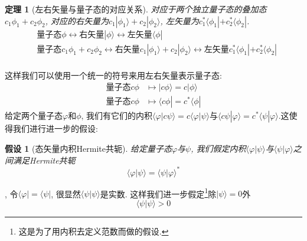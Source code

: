 \documentclass[a4paper,11pt]{book}
\newtheorem{theorem}{\hspace{2em}定理}[section]
\newtheorem{hypothesis}{假设}[section]
\begin{document}
\begin{theorem}[左右矢量与量子态的对应关系]
  对应于两个独立量子态的叠加态$c_1\phi_1+c_2\phi_2$, 对应的右矢量为$c_1|\phi_1\rangle+c_2|\phi_2\rangle$, 左矢量为$c_1^*\langle\phi_1|+c_2^*\langle\phi_2|$.
\begin{equation*}
  \begin{split}
     &\text{量子态}\phi\longleftrightarrow\text{右矢量}|\phi\rangle\longleftrightarrow\text{左矢量}\langle\phi|\\
     &\text{量子态}c_1\phi_1+c_2\phi_2\longleftrightarrow\text{右矢量}c_1|\phi_1\rangle+c_2|\phi_2\rangle\longleftrightarrow\text{左矢量}c_1^*\langle\phi_1|+c_2^*\langle\phi_2|\\
  \end{split}
\end{equation*}
\end{theorem}
这样我们可以使用一个统一的符号来用左右矢量表示量子态:
\begin{equation*}
  \begin{split}
     \text{量子态}c\phi & \longmapsto|c\phi\rangle=c|\phi\rangle \\
     \text{量子态}c\phi & \longmapsto\langle c\phi|=c^*\langle\phi|
  \end{split}
\end{equation*}
给定两个量子态$\varphi$和$\phi$, 我们有它们的内积$\langle\varphi|c\psi\rangle=c\langle\varphi|\psi\rangle$与$\langle c\psi|\varphi\rangle=c^*\langle\psi|\varphi\rangle$.这使得我们进行进一步的假设:
\begin{hypothesis}[态矢量内积Hermite共轭]
给定量子态$\varphi$与$\psi$, 我们假定内积$\langle\varphi|\psi\rangle$与$\langle\psi|\varphi\rangle$之间满足Hermite共轭
\begin{equation*}
  \langle\varphi|\psi\rangle=\langle\psi|\varphi\rangle^*
\end{equation*}
\end{hypothesis}
, 令$\langle\varphi|=\langle\psi|$, 很显然$\langle\psi|\psi\rangle$是实数. 这样我们进一步假定\footnote{这是为了用内积去定义范数而做的假设.}除$|\psi\rangle=0$外
\begin{equation}\label{braket proper}
  \langle\psi|\psi\rangle>0
\end{equation}
\end{document}
